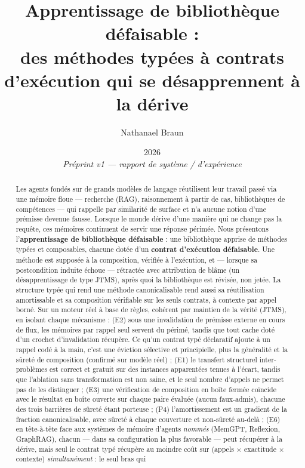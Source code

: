 \documentclass[11pt]{article}
\title{\textbf{Apprentissage de bibliothèque défaisable :\\ des méthodes typées à contrats d'exécution qui se désapprennent à la dérive}}
\author{Nathanael Braun}
\date{2026 \\[2pt] {\normalsize\itshape Préprint v1 --- rapport de système / d'expérience}}
\begin{document}
\maketitle

\begin{abstract}
Les agents fondés sur de grands modèles de langage réutilisent leur travail passé via une mémoire floue ---
recherche (RAG), raisonnement à partir de cas, bibliothèques de compétences --- qui rappelle par similarité de
surface et n'a aucune notion d'une prémisse devenue fausse. Lorsque le monde dérive d'une manière qui ne change pas
la requête, ces mémoires continuent de servir une réponse périmée. Nous présentons l'\textbf{apprentissage de
bibliothèque défaisable} : une bibliothèque apprise de méthodes typées et composables, chacune dotée d'un
\textbf{contrat d'exécution défaisable}. Une méthode est supposée à la composition, vérifiée à l'exécution, et ---
lorsque sa postcondition induite échoue --- rétractée avec attribution de blâme (un désapprentissage de type JTMS),
après quoi la bibliothèque est révisée, non jetée. La structure typée qui rend une méthode canonicalisable rend
aussi sa réutilisation amortissable et sa composition vérifiable sur les seuls contrats, à contexte par appel
borné. Sur un moteur réel à base de règles, cohérent par maintien de la vérité (JTMS), en isolant chaque mécanisme :
(E2) sous une invalidation de prémisse externe en cours de flux, les mémoires par rappel seul servent du périmé,
tandis que tout cache doté d'un crochet d'invalidation récupère. Ce qu'un contrat typé déclaratif ajoute à un
rappel codé à la main, c'est une éviction sélective et principielle, plus la généralité et la sûreté de composition
(confirmé sur modèle réel) ; (E1) le transfert structurel inter-problèmes est correct et gratuit sur des instances
apparentées tenues à l'écart, tandis que l'ablation sans transformation est non saine, et le seul nombre d'appels
ne permet pas de les distinguer ; (E3) une vérification de composition en boîte fermée coïncide avec le résultat en
boîte ouverte sur chaque paire évaluée (aucun faux-admis), chacune des trois barrières de sûreté étant porteuse ;
(P4) l'amortissement est un gradient de la fraction canonicalisable, avec sûreté à chaque couverture et non-sûreté
au-delà ; (E6) en tête-à-tête face aux systèmes de mémoire d'agents \emph{nommés} (MemGPT, Reflexion, GraphRAG),
chacun --- dans sa configuration la plus favorable --- peut récupérer à la dérive, mais seul le contrat typé
récupère au moindre coût sur (appels $\times$ exactitude $\times$ contexte) \emph{simultanément} : le seul bras qui

\end{abstract}
\end{document}

